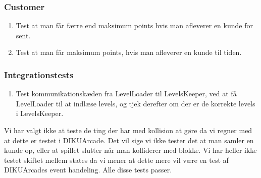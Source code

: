    \subsubsection{Customer}
      \begin{enumerate}
         \item Test at man får færre end maksimum points hvis man afleverer en kunde for sent.
         \item Test at man får maksimum points, hvis man afleverer en kunde til tiden.
      \end{enumerate}
   \subsubsection{Integrationstests}
      \begin{enumerate}
         \item Test kommunikationskæden fra LevelLoader til LevelsKeeper, ved at få LevelLoader til at indlæse levels, og tjek derefter om der er de korrekte levels i LevelsKeeper.
      \end{enumerate}
      Vi har valgt ikke at teste de ting der har med kollision at gøre da vi regner med at dette er testet i DIKUArcade. Det vil sige vi ikke tester det at man samler en kunde op, eller at spillet slutter når man kolliderer med blokke. Vi har heller ikke testet skiftet mellem states da vi mener at dette mere vil være en test af DIKUArcades event handeling. Alle disse tests passer.
